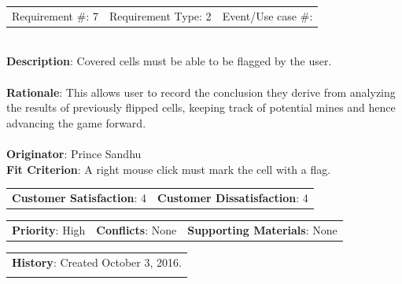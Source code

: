 \documentclass[12pt, titlepage]{article}
\begin{document}
\begin{reqbox}

\begin{tabular}{lll}
Requirement \#: 7 & Requirement Type: 2 & Event/Use case \#: \\
\end{tabular} \\

\textbf{Description}: Covered cells must be able to be flagged by the user. \\ \\
\textbf{Rationale}: This allows user to record the conclusion they derive from analyzing the results of previously flipped
cells, keeping track of potential mines and hence advancing the game forward. \\ \\
\textbf{Originator}: Prince Sandhu \\
\textbf{Fit Criterion}: A right mouse click must mark the cell with a flag. \\

\begin{tabular}{ll}
\textbf{Customer Satisfaction}: 4 & \textbf{Customer Dissatisfaction}: 4 \\
\end{tabular}

\begin{tabular}{lll}
\textbf{Priority}: High & \textbf{Conflicts}: None & \textbf{Supporting Materials}: None \\
\end{tabular}

\begin{tabular}{l}
\textbf{History}: Created October 3, 2016.\\ \\
\end{tabular} \\

\end{reqbox}
\end{document}
